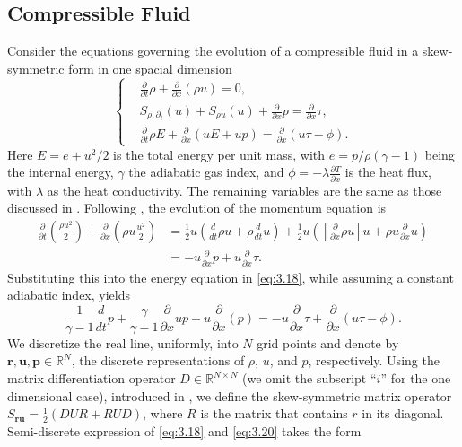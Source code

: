 \subsection{Compressible Fluid} \label{sec:skew.3}
Consider the equations governing the evolution of a compressible fluid in a skew-symmetric form in one spacial dimension
\begin{equation} \label{eq:3.18}
\left\{
\begin{aligned}
	&\frac{\partial}{\partial t} \rho + \frac{\partial }{\partial x}(\rho u) = 0, \\ 
	& S_{\rho,\partial_t}(u)+ S_{\rho u}(u) + \frac{\partial }{\partial x} p = \frac{\partial }{\partial x} \tau, \\
	&\frac{\partial}{\partial t} \rho E + \frac{\partial}{\partial x}(u E + up) = \frac{\partial }{\partial x}(u\tau - \phi).
\end{aligned}
\right.
\end{equation}
Here $E= e + u^2/2$ is the total energy per unit mass, with $e = {p}/{\rho(\gamma - 1)}$ being the internal energy, $\gamma$ the adiabatic gas index, and $\phi = -\lambda \frac{\partial T}{\partial x}$ is the heat flux, with $\lambda$ as the heat conductivity. The remaining variables are the same as those discussed in . Following \cite{reiss2014conservative}, the evolution of the momentum equation is
\begin{equation} \label{eq:3.19}
	\begin{aligned}
	\frac{\partial}{\partial t}(\frac{\rho u^2}{2}) + \frac{\partial }{\partial x}(\rho u \frac{u^2}{2}) &= \frac 1 2 u( \frac{d}{dt} \rho u + \rho \frac{d}{dt} u ) + \frac 1 2 u ( [ \frac{\partial}{\partial x} \rho u ] u + \rho u \frac{\partial }{\partial x} u ) \\
	& = - u \frac{\partial}{\partial x} p + u \frac{\partial}{\partial x} \tau.
	\end{aligned}
\end{equation}
Substituting this into the energy equation in \eqref{eq:3.18}, while assuming a constant adiabatic index, yields
\begin{equation} \label{eq:3.20}
	\frac{1}{\gamma -1} \frac{d}{dt} p + \frac{\gamma}{\gamma -1} \frac{\partial }{\partial x} up - u \frac{\partial }{\partial x}(p) = - u \frac{\partial}{\partial x} \tau + \frac{\partial }{\partial x}(u\tau - \phi).
\end{equation}
We discretize the real line, uniformly, into $N$ grid points and denote by $\mathbf r, \mathbf u, \mathbf p \in \mathbb R^{N}$, the discrete representations of $\rho$, $u$, and $p$, respectively. Using the matrix differentiation operator $D\in \mathbb R^{N\times N}$ (we omit the subscript ``$i$'' for the one dimensional case), introduced in , we define the skew-symmetric matrix operator $S_{\mathbf r \mathbf u} = \frac 1 2 (DUR + RUD)$, where $R$ is the matrix that contains $r$ in its diagonal. Semi-discrete expression of \eqref{eq:3.18} and \eqref{eq:3.20} takes the form

